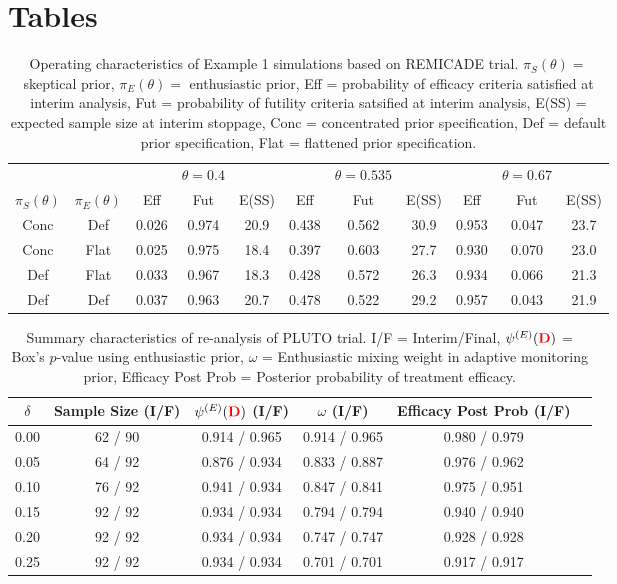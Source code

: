\documentclass[12pt]{article}
\begin{document}
\newpage
\section*{Tables}

\begin{table}[htbp]\label{tbl:sim-remi}%
\centering
\caption{Operating characteristics of Example 1 simulations based on REMICADE trial. $\pi_S(\theta)=$ skeptical prior, $\pi_E(\theta)=$ enthusiastic prior, Eff = probability of efficacy criteria satisfied at interim analysis, Fut = probability of futility criteria satsified at interim analysis, E(SS) = expected sample size at interim stoppage, Conc = concentrated prior specification, Def = default prior specification, Flat = flattened prior specification. }%
\begin{tabular*}{500pt}{@{\extracolsep\fill}ccccccccccc@{\extracolsep\fill}}%
\toprule
	&		&	&		$\theta=0.4$&			&		&	$\theta=0.535$	&		&	&		$\theta=0.67$&		\\
	\cline{3-5} \cline{6-8} \cline{9-11}
$\pi_S(\theta)$	&	$\pi_E(\theta)$	&	Eff  &	Fut 	&	E(SS) &	Eff  &	Fut 	&	E(SS) 	&	Eff  &	Fut 	&	E(SS) 	\\
\midrule
Conc	&	Def	&	0.026	&	0.974	&	20.9 	&	0.438	&	0.562	&	30.9	&	0.953	&	0.047	&	23.7	\\
Conc	&	Flat	&	0.025	&	0.975	&	18.4 	&	0.397	&	0.603	&	27.7	&	0.930	&	0.070	&	23.0	\\
Def	&	Flat	&	0.033	&	0.967	&	18.3	&	0.428	&	0.572	&	26.3	&	0.934	&	0.066	&	21.3 	\\
Def	&	Def	&	0.037	&	0.963	&	20.7	&	0.478	&	0.522	&	29.2 	&	0.957	&	0.043	&	21.9	\\
\bottomrule
\end{tabular*}
\end{table}

\newpage
\begin{table}[htbp]\label{tbl:real-pluto}%
\centering
\caption{Summary characteristics of re-analysis of PLUTO trial. I/F = Interim/Final, $\psi^{(E)}(\textcolor{red}{\mathbf{D}})$ = Box's $p$-value using enthusiastic prior, $\omega$ = Enthusiastic mixing weight in adaptive monitoring prior, Efficacy Post Prob = Posterior probability of treatment efficacy.}%
\begin{tabular*}{450pt}{@{\extracolsep\fill}cccccc@{\extracolsep\fill}}%
\toprule
$\delta$	&	Sample Size (I/F)			&	$\psi^{(E)}(\textcolor{red}{\mathbf{D}})$ (I/F)			&	$\omega$ (I/F)			&	Efficacy Post Prob (I/F)			\\
\midrule
0.00	&	62	/	90	&	0.914	/	0.965	&	0.914	/	0.965	&	0.980	/	0.979	\\
0.05	&	64	/	92	&	0.876	/	0.934	&	0.833	/	0.887	&	0.976	/	0.962	\\
0.10	&	76	/	92	&	0.941	/	0.934	&	0.847	/	0.841	&	0.975	/	0.951	\\
0.15	&	92	/	92	&	0.934	/	0.934	&	0.794	/	0.794	&	0.940	/	0.940	\\
0.20	&	92	/	92	&	0.934	/	0.934	&	0.747	/	0.747	&	0.928	/	0.928	\\
0.25	&	92	/	92	&	0.934	/	0.934	&	0.701	/	0.701	&	0.917	/	0.917	\\
\bottomrule
\end{tabular*}
\end{table}
\end{document}

